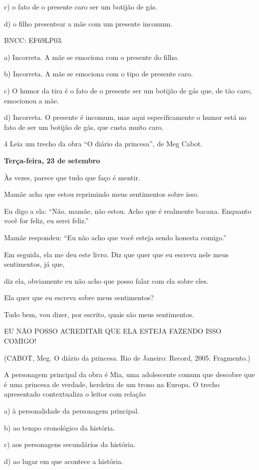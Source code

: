 c) o fato de o presente caro ser um botijão de gás.

d) o filho presentear a mãe com um presente incomum.

BNCC: EF69LP03.

a) Incorreta. A mãe se emociona com o presente do filho.

b) Incorreta. A mãe se emociona com o tipo de presente caro.

c) O humor da tira é o fato de o presente ser um botijão de gás que, de
tão caro, emocionou a mãe.

d) Incorreta. O presente é incomum, mas aqui especificamente o humor
está no fato de ser um botijão de gás, que custa muito caro.

\num{4} Leia um trecho da obra ``O diário da princesa'', de Meg Cabot.

\textbf{Terça-feira, 23 de setembro}

Às vezes, parece que tudo que faço é mentir.

Mamãe acha que estou reprimindo meus sentimentos sobre isso.

Eu digo a ela: ``Não, mamãe, não estou. Acho que é realmente bacana.
Enquanto você for feliz, eu serei feliz.''

Mamãe respondeu: ``Eu não acho que você esteja sendo honesta comigo.''

Em seguida, ela me deu este livro. Diz que quer que eu escreva nele meus
sentimentos, já que,

diz ela, obviamente eu não acho que posso falar com ela sobre eles.

Ela quer que eu escreva sobre meus sentimentos?

Tudo bem, vou dizer, por escrito, quais são meus sentimentos.

EU NÃO POSSO ACREDITAR QUE ELA ESTEJA FAZENDO ISSO COMIGO!

(CABOT, Meg. O diário da princesa. Rio de Janeiro: Record, 2005.
Fragmento.)

A personagem principal da obra é Mia, uma adolescente comum que descobre
que é uma princesa de verdade, herdeira de um trono na Europa. O trecho
apresentado contextualiza o leitor com relação

a) à personalidade da personagem principal.

b) ao tempo cronológico da história.

c) aos personagens secundários da história.

d) ao lugar em que acontece a história.

